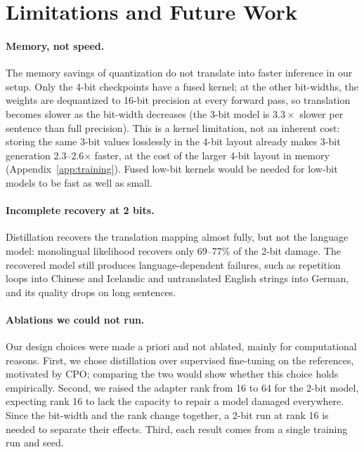 \documentclass[10pt]{article}
\begin{document}
\section*{Limitations and Future Work}

\paragraph{Memory, not speed.} The memory savings of quantization do not
translate into faster inference in our setup. Only the 4-bit checkpoints have a
fused kernel; at the other bit-widths, the weights are dequantized to 16-bit
precision at every forward pass, so translation becomes slower as the bit-width
decreases (the 3-bit model is $3.3\times$ slower per sentence than full
precision). This is a kernel limitation, not an inherent cost: storing the same
3-bit values losslessly in the 4-bit layout already makes 3-bit generation
2.3--2.6$\times$ faster, at the cost of the larger 4-bit layout in memory
(Appendix~\ref{app:training}). Fused low-bit kernels would be needed for low-bit
models to be fast as well as small.

\paragraph{Incomplete recovery at 2 bits.} Distillation recovers the translation
mapping almost fully, but not the language model: monolingual likelihood
recovers only 69--77\% of the 2-bit damage. The recovered model still produces
language-dependent failures, such as repetition loops into Chinese and
Icelandic and untranslated English strings into German, and its quality drops
on long sentences.

\paragraph{Ablations we could not run.} Our design choices were made a priori
and not ablated, mainly for computational reasons. First, we chose distillation
over supervised fine-tuning on the references, motivated by CPO; comparing the
two would show whether this choice holds empirically. Second, we raised the
adapter rank from 16 to 64 for the 2-bit model, expecting rank 16 to lack the
capacity to repair a model damaged everywhere. Since the bit-width and the rank
change together, a 2-bit run at rank 16 is needed to separate their effects.
Third, each result comes from a single training run and seed.
\end{document}
